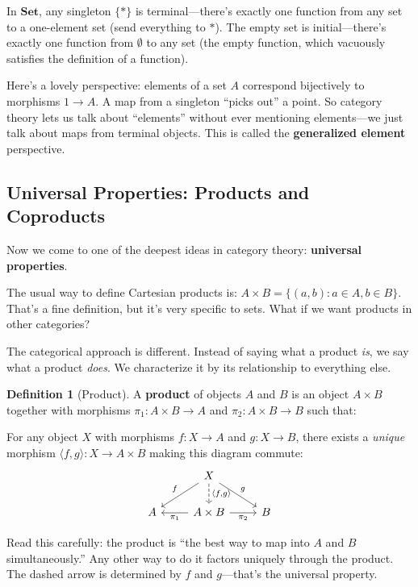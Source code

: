 \documentclass[11pt]{article}
\newcommand{\cat}[1]{\mathbf{#1}}
\newcommand{\Set}{\cat{Set}}
\theoremstyle{definition}
\newtheorem{definition}{Definition}[section]
\theoremstyle{plain}
\theoremstyle{remark}
\begin{document}
In $\Set$, any singleton $\{*\}$ is terminal---there's exactly one function from any set to a one-element set (send everything to $*$). The empty set is initial---there's exactly one function from $\emptyset$ to any set (the empty function, which vacuously satisfies the definition of a function).

Here's a lovely perspective: elements of a set $A$ correspond bijectively to morphisms $1 \to A$. A map from a singleton ``picks out'' a point. So category theory lets us talk about ``elements'' without ever mentioning elements---we just talk about maps from terminal objects. This is called the \textbf{generalized element} perspective.

\subsection{Universal Properties: Products and Coproducts}

Now we come to one of the deepest ideas in category theory: \textbf{universal properties}.

The usual way to define Cartesian products is: $A \times B = \{(a, b) : a \in A, b \in B\}$. That's a fine definition, but it's very specific to sets. What if we want products in other categories?

The categorical approach is different. Instead of saying what a product \emph{is}, we say what a product \emph{does}. We characterize it by its relationship to everything else.

\begin{definition}[Product]
A \textbf{product} of objects $A$ and $B$ is an object $A \times B$ together with morphisms $\pi_1: A \times B \to A$ and $\pi_2: A \times B \to B$ such that:

For any object $X$ with morphisms $f: X \to A$ and $g: X \to B$, there exists a \emph{unique} morphism $\langle f, g \rangle: X \to A \times B$ making this diagram commute:
\[
\begin{tikzcd}
 & X \arrow[dl, "f"'] \arrow[d, dashed, "{\langle f, g \rangle}"] \arrow[dr, "g"] & \\
A & A \times B \arrow[l, "\pi_1"] \arrow[r, "\pi_2"'] & B
\end{tikzcd}
\]
\end{definition}

Read this carefully: the product is ``the best way to map into $A$ and $B$ simultaneously.'' Any other way to do it factors uniquely through the product. The dashed arrow is determined by $f$ and $g$---that's the universal property.
\end{document}
